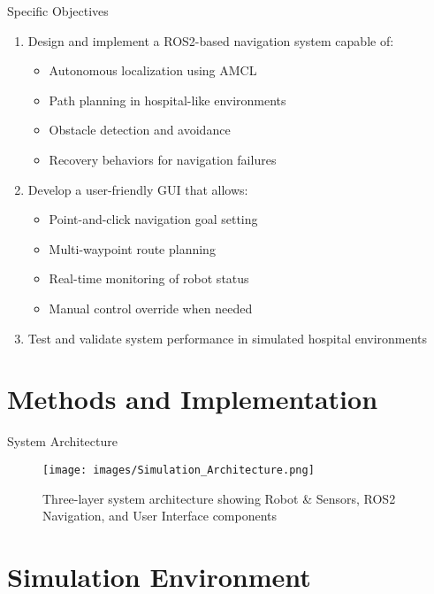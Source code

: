 \documentclass[aspectratio=169]{beamer}
\begin{document}
\begin{frame}{Specific Objectives}
  \begin{enumerate}
  \item Design and implement a ROS2-based navigation system capable of:
    \begin{itemize}
    \item Autonomous localization using AMCL
    \item Path planning in hospital-like environments
    \item Obstacle detection and avoidance
    \item Recovery behaviors for navigation failures
    \end{itemize}
  \item Develop a user-friendly GUI that allows:
    \begin{itemize}
    \item Point-and-click navigation goal setting
    \item Multi-waypoint route planning
    \item Real-time monitoring of robot status
    \item Manual control override when needed
    \end{itemize}
  \item Test and validate system performance in simulated hospital environments
  \end{enumerate}
\end{frame}

\section{Methods and Implementation}

\begin{frame}{System Architecture}
  \begin{figure}
    \centering
    \texttt{[image: images/Simulation\_Architecture.png]}
    \caption{Three-layer system architecture showing Robot \& Sensors, ROS2 Navigation, and User Interface components}
  \end{figure}
\end{frame}

\section{Simulation Environment}
\end{document}

